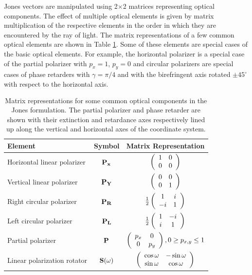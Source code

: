 Jones vectors are manipulated using 2$\times$2 matrices representing optical components. The effect of multiple optical elements is given by matrix multiplication of the respective elements in the order in which they are encountered by the ray of light. The matrix representations of a few common optical elements are shown in Table \ref{tab:jones_matrices}. Some of these elements are special cases of the basic optical elements. For example, the horizontal polarizer is a special case of the partial polarizer with $p_x=1$, $p_y=0$ and circular polarizers are special cases of phase retarders with $\gamma=\pi/4$ and with the birefringent axis rotated $\pm 45^{\circ}$ with respect to the horizontal axis. 
\begin{table}
\caption{\label{tab:jones_matrices}Matrix representations for some common optical components in the Jones formulation. The partial polarizer and phase retarder are shown with their extinction and retardance axes respectively lined up along the vertical and horizontal axes of the coordinate system.}
\begin{center}
\begin{tabular}{|l|c|c|}\hline
Element&Symbol&Matrix Representation\\\hline
Horizontal linear polarizer&$\bf P_x$&$\left(\begin{array}{c c}1&0\\0&0\end{array}\right)$\\\hline
Vertical linear polarizer&$\bf P_Y$&$\left(\begin{array}{c c}0&0\\0&1\end{array}\right)$\\\hline
Right circular polarizer&$\bf P_R$&$\frac{1}{2}\left(\begin{array}{c c}1&i\\-i&1\end{array}\right)$\\\hline
Left circular polarizer&$\bf P_L$&$\frac{1}{2}\left(\begin{array}{c c}1&-i\\i&1\end{array}\right)$\\\hline
Partial polarizer&$\bf P$&$\left(\begin{array}{c c}p_x&0\\0&p_y\end{array}\right),0\ge p_{x,y}\le1$\\\hline
Linear polarization rotator&$\bf S(\omega)$&$\left(\begin{array}{c c}\cos{\omega}&-\sin{\omega}\\\sin{\omega}&\cos{\omega}\end{array}\right)$\\\hline

\end{tabular}
\end{center}
\end{table}
